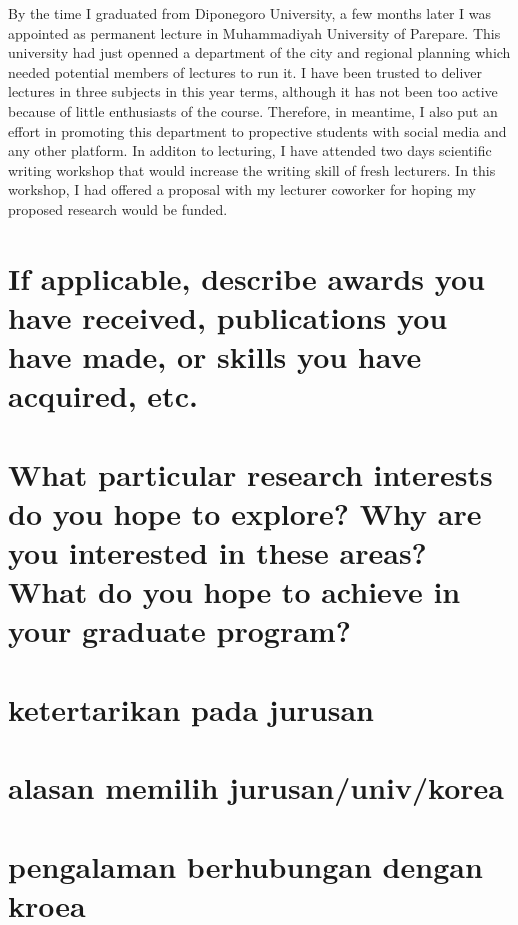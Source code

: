 \documentclass[11pt]{simart} %
\begin{document}
By the time I graduated from Diponegoro University, a few months later I was appointed as permanent lecture in Muhammadiyah University of Parepare.
This university had just openned a department of the city and regional planning which needed potential members of lectures to run it.
I have been trusted to deliver lectures in three subjects in this year terms, although it has not been too active because of little enthusiasts of the course.
Therefore, in meantime, I also put an effort in promoting this department to propective students with social media and any other platform.
In additon to lecturing, I have attended two days scientific writing workshop that would increase the writing skill of fresh lecturers. In this workshop, I had offered a proposal with my lecturer coworker for hoping my proposed research would be funded.


\section{If applicable, describe awards you have received, publications you have made, or skills you have acquired, etc.}

\section{What particular research interests do you hope to explore? Why are you interested in these areas? What do you hope to achieve in your graduate program?}
\section*{ketertarikan pada jurusan}
\section*{alasan memilih jurusan/univ/korea}
\section*{pengalaman berhubungan dengan kroea}
















%

%
\end{document}
